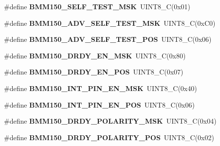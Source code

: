 \begin{DoxyCompactItemize}
\#define {\bfseries B\+M\+M150\+\_\+\+S\+E\+L\+F\+\_\+\+T\+E\+S\+T\+\_\+\+M\+SK}~U\+I\+N\+T8\+\_\+C(0x01)
\item 
\mbox{\label{group___b_m_m150_ga5f989ad279daee6ed020efff2ead4303}} 
\#define {\bfseries B\+M\+M150\+\_\+\+A\+D\+V\+\_\+\+S\+E\+L\+F\+\_\+\+T\+E\+S\+T\+\_\+\+M\+SK}~U\+I\+N\+T8\+\_\+C(0x\+C0)
\item 
\mbox{\label{group___b_m_m150_gaf48a3b129a2fc9a8dea057dd317a52bd}} 
\#define {\bfseries B\+M\+M150\+\_\+\+A\+D\+V\+\_\+\+S\+E\+L\+F\+\_\+\+T\+E\+S\+T\+\_\+\+P\+OS}~U\+I\+N\+T8\+\_\+C(0x06)
\item 
\mbox{\label{group___b_m_m150_gac7886d152790cca4273e3647d08e6cef}} 
\#define {\bfseries B\+M\+M150\+\_\+\+D\+R\+D\+Y\+\_\+\+E\+N\+\_\+\+M\+SK}~U\+I\+N\+T8\+\_\+C(0x80)
\item 
\mbox{\label{group___b_m_m150_ga3fb2e35230df5f0cdc466596f7eaa27c}} 
\#define {\bfseries B\+M\+M150\+\_\+\+D\+R\+D\+Y\+\_\+\+E\+N\+\_\+\+P\+OS}~U\+I\+N\+T8\+\_\+C(0x07)
\item 
\mbox{\label{group___b_m_m150_ga0ff5eed97208678cd89b05882e150f6b}} 
\#define {\bfseries B\+M\+M150\+\_\+\+I\+N\+T\+\_\+\+P\+I\+N\+\_\+\+E\+N\+\_\+\+M\+SK}~U\+I\+N\+T8\+\_\+C(0x40)
\item 
\mbox{\label{group___b_m_m150_ga98d2ca4d86fac35900d4d5f755ab7940}} 
\#define {\bfseries B\+M\+M150\+\_\+\+I\+N\+T\+\_\+\+P\+I\+N\+\_\+\+E\+N\+\_\+\+P\+OS}~U\+I\+N\+T8\+\_\+C(0x06)
\item 
\mbox{\label{group___b_m_m150_ga88024ceb300ad8a9b1ee5a4255c8a84f}} 
\#define {\bfseries B\+M\+M150\+\_\+\+D\+R\+D\+Y\+\_\+\+P\+O\+L\+A\+R\+I\+T\+Y\+\_\+\+M\+SK}~U\+I\+N\+T8\+\_\+C(0x04)
\item 
\mbox{\label{group___b_m_m150_ga2f5563c023d45dc5bcf09a1689ce429b}} 
\#define {\bfseries B\+M\+M150\+\_\+\+D\+R\+D\+Y\+\_\+\+P\+O\+L\+A\+R\+I\+T\+Y\+\_\+\+P\+OS}~U\+I\+N\+T8\+\_\+C(0x02)
\item 
\mbox{\label{group___b_m_m150_ga7aab5f095a25947b16fc5a9b122f344b}} 

\end{DoxyCompactItemize}
